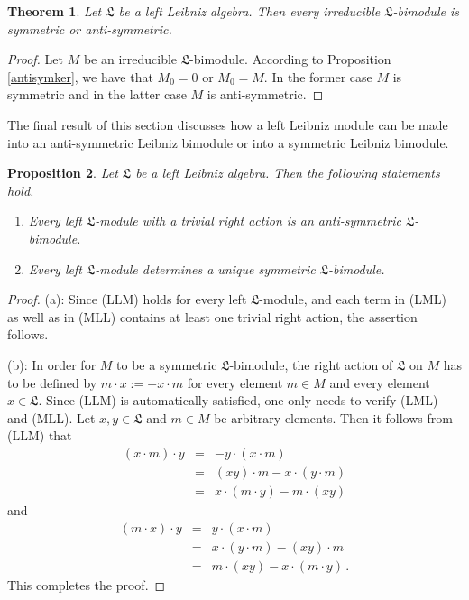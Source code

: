 \documentclass{amsart}
\newtheorem{thm}{Theorem}[section]
\newtheorem{pro}[thm]{Proposition}
\numberwithin{equation}{section}
\newcommand{\lf}{\mathfrak{L}}
\begin{document}
\begin{thm}\label{irrbimod}
Let $\lf$ be a left Leibniz algebra. Then every irreducible $\lf$-bimodule is symmetric or anti-symmetric.
\end{thm}

\begin{proof}
Let $M$ be an irreducible $\lf$-bimodule. According to Proposition \ref{antisymker}, we have that $M_0
=0$ or $M_0=M$. In the former case $M$ is symmetric and in the latter case $M$ is anti-symmetric.
\end{proof}

The final result of this section discusses how a left Leibniz module can be made into an anti-symmetric
Leibniz bimodule or into a symmetric Leibniz bimodule.

\begin{pro}\label{leftmod}
Let $\lf$ be a left Leibniz algebra. Then the following statements hold.
\begin{enumerate}
\item[{\rm (a)}] Every left $\lf$-module with a trivial right action is an anti-symmetric $\lf$-bimodule.
\item[{\rm (b)}] Every left $\lf$-module determines a unique symmetric $\lf$-bimodule.
\end{enumerate}
\end{pro}

\begin{proof}
(a): Since (LLM) holds for every left $\lf$-module, and each term in (LML) as well as in (MLL)
contains at least one trivial right action, the assertion follows.

(b): In order for $M$ to be a symmetric $\lf$-bimodule, the right action of $\lf$ on $M$ has to
be defined by $m\cdot x:=-x\cdot m$ for every element $m\in M$ and every element $x\in\lf$.
Since (LLM) is automatically satisfied, one only needs to verify (LML) and (MLL). Let $x,y\in\lf$
and $m\in M$ be arbitrary elements. Then it follows from (LLM) that
\begin{eqnarray*}
(x\cdot m)\cdot y & = & -y\cdot(x\cdot m)\\
& = & (xy)\cdot m-x\cdot(y\cdot m)\\
& = & x\cdot(m\cdot y)-m\cdot(xy)
\end{eqnarray*}
and
\begin{eqnarray*}
(m\cdot x)\cdot y & = & y\cdot(x\cdot m)\\
& = & x\cdot(y\cdot m)-(xy)\cdot m\\
& = & m\cdot(xy)-x\cdot(m\cdot y)\,.
\end{eqnarray*}
This completes the proof.
\end{proof}
\vspace{.2cm}
\end{document}
